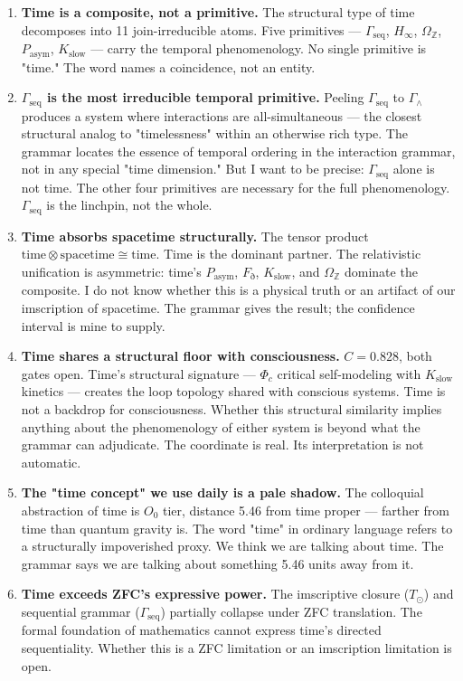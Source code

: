 \documentclass[12pt,a4paper]{article}
\begin{document}
\begin{enumerate}
    \item \textbf{Time is a composite, not a primitive.} The structural type of time decomposes into 11 join-irreducible atoms. Five primitives --- $\Gamma_\text{seq}$, $H_{\infty}$, $\Omega_\mathbb{Z}$, $P_\text{asym}$, $K_\text{slow}$ --- carry the temporal phenomenology. No single primitive is "time." The word names a coincidence, not an entity.
    \item \textbf{$\Gamma_\text{seq}$ is the most irreducible temporal primitive.} Peeling $\Gamma_\text{seq}$ to $\Gamma_{\wedge}$ produces a system where interactions are all-simultaneous --- the closest structural analog to "timelessness" within an otherwise rich type. The grammar locates the essence of temporal ordering in the interaction grammar, not in any special "time dimension." But I want to be precise: $\Gamma_\text{seq}$ alone is not time. The other four primitives are necessary for the full phenomenology. $\Gamma_\text{seq}$ is the linchpin, not the whole.
    \item \textbf{Time absorbs spacetime structurally.} The tensor product $\text{time} \otimes \text{spacetime} \cong \text{time}$. Time is the dominant partner. The relativistic unification is asymmetric: time's $P_\text{asym}$, $F_{\eth}$, $K_\text{slow}$, and $\Omega_\mathbb{Z}$ dominate the composite. I do not know whether this is a physical truth or an artifact of our imscription of spacetime. The grammar gives the result; the confidence interval is mine to supply.
    \item \textbf{Time shares a structural floor with consciousness.} $C = 0.828$, both gates open. Time's structural signature --- $\Phi_c$ critical self-modeling with $K_\text{slow}$ kinetics --- creates the loop topology shared with conscious systems. Time is not a backdrop for consciousness. Whether this structural similarity implies anything about the phenomenology of either system is beyond what the grammar can adjudicate. The coordinate is real. Its interpretation is not automatic.
    \item \textbf{The "time concept" we use daily is a pale shadow.} The colloquial abstraction of time is $O_0$ tier, distance 5.46 from time proper --- farther from time than quantum gravity is. The word "time" in ordinary language refers to a structurally impoverished proxy. We think we are talking about time. The grammar says we are talking about something 5.46 units away from it.
    \item \textbf{Time exceeds ZFC's expressive power.} The imscriptive closure ($T_{\odot}$) and sequential grammar ($\Gamma_\text{seq}$) partially collapse under ZFC translation. The formal foundation of mathematics cannot express time's directed sequentiality. Whether this is a ZFC limitation or an imscription limitation is open.

\end{enumerate}
\end{document}
